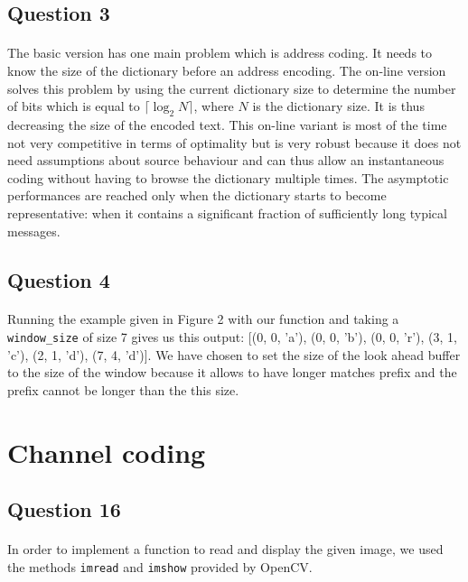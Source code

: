 \documentclass[a4paper, 11pt, oneside]{article}
\begin{document}
\subsection{Question 3}
\paragraph{}The basic version has one main problem which is address coding. It needs to know the
size of the dictionary before an address encoding. The on-line version solves this problem by using the current dictionary size to determine the number of bits which is equal to $\lceil\log_2{N}\rceil$, where $N$ is the dictionary size. It is thus decreasing the size of the encoded text. This on-line variant is most of the time not very competitive in
terms of optimality but is very robust because it does not need assumptions about source behaviour and can thus allow an instantaneous coding without having to browse the dictionary multiple times. The asymptotic performances are reached only when the dictionary starts to become
representative: when it contains a significant fraction of sufficiently long typical messages.

\subsection{Question 4}
\paragraph{}Running the example given in Figure 2 with our function and taking a \texttt{window\_size} of size 7 gives us this output: [(0, 0, 'a'), (0, 0, 'b'), (0, 0, 'r'), (3, 1, 'c'), (2, 1, 'd'), (7, 4, 'd')]. We have chosen to set the size of the look ahead buffer to the size of the window because it allows to have longer matches prefix and the prefix cannot be longer than the this size.

\section{Channel coding}

\subsection{Question 16}
\paragraph{}In order to implement a function to read and display the given image, we used the methods \texttt{imread} and \texttt{imshow} provided by OpenCV.
\end{document}
